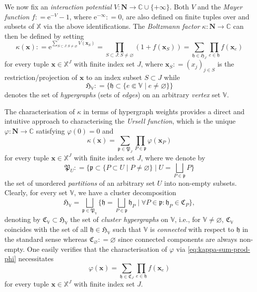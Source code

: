 \documentclass[reqno, 11pt]{amsart}
\theoremstyle{definition}
\newcommand{\e}{\mathrm{e}}
\newcommand{\C}{\mathbb{C}}
\newcommand{\X}{\mathbb X}
\newcommand{\V}{\mathbb V}
\newcommand{\be}{\begin{equation}}
\newcommand{\ee}{\end{equation}}
\begin{document}
We now fix an \emph{interaction potential} $V : \mathbf N \to \C \cup \{+\infty\}$. 
Both $V$ and the \emph{Mayer function} $f : = \e^{-V} - 1$, where $\e^{-\infty} : = 0$, are also defined on finite tuples over and subsets of $\X$ via the above identifications. 
The \emph{Boltzmann factor} $\kappa : \mathbf N \to \C$ can then be defined by setting
\[
	\kappa(\mathbf x) : = \e^{\sum_{S \subset J : S \neq \varnothing} V(\mathbf x_S)} = \prod_{S \subset J : S \neq \varnothing} (1 + f(\mathbf x_S)) = \sum_{\mathfrak h \in \mathfrak H_J} \prod_{e \in \mathfrak h} f(\mathbf x_e)
\]
for every tuple $\mathbf x \in \X^J$ with finite index set $J$, where $\mathbf x_S : = (x_j)_{j \in S}$ is the restriction/projection of $\mathbf x$ to an index subset $S \subset J$ while
\[
	\mathfrak H_\V : = \{\mathfrak h \subset \{e \Subset \V \mid e \neq \varnothing\}\}
\]
denotes the set of \emph{hypergraphs} (sets of \emph{edges}) on an arbitrary \emph{vertex} set $\V$. 

The characterisation of $\kappa$ in terms of hypergraph weights provides a direct and intuitive approach to characterising the \emph{Ursell function}, which is the unique $\varphi : \mathbf N \to \C$ satisfying $\varphi(0) = 0$ and
\be \label{eq:kappa-sum-prod-phi}
	\kappa(\mathbf x) = \sum_{\mathfrak p \in \mathfrak P_J} \prod_{P \in \mathfrak p} \varphi(\mathbf x_P)
\ee
for every tuple $\mathbf x \in \X^J$ with finite index set $J$, where we denote by
\[
	\mathfrak P_U : = \{\mathfrak p \subset \{P \subset U \mid P \neq \varnothing\} \mid U = \textstyle \bigsqcup_{P \in \mathfrak p} P\}
\]
the set of unordered \emph{partitions} of an arbitrary set $U$ into non-empty subsets. 
Clearly, for every set $\V$, we have a cluster decomposition
\[
	\mathfrak H_\V = \bigsqcup_{\mathfrak p \in \mathfrak P_\V} \{\mathfrak h = \textstyle \bigsqcup_{P \in \mathfrak p} \mathfrak h_P \mid \forall P \in \mathfrak p : \mathfrak h_P \in \mathfrak C_P\},
\]
denoting by $\mathfrak C_\V \subset \mathfrak H_\V$ the set of \emph{cluster hypergraphs} on $\V$, i.e., for $\V \neq \varnothing$, $\mathfrak C_\V$ coincides with the set of all $\mathfrak h \in \mathfrak H_\V$ such that $\V$ is \emph{connected} with respect to $\mathfrak h$ in the standard sense whereas $\mathfrak C_\varnothing : = \varnothing$ since connected components are always non-empty. 
One easily verifies that the characterisation of $\varphi$ via \eqref{eq:kappa-sum-prod-phi} necessitates
\[
	\varphi(\mathbf x) = \sum_{\mathfrak h \in \mathfrak C_J} \prod_{e \in \mathfrak h} f(\mathbf x_e)
\]
for every tuple $\mathbf x \in \X^J$ with finite index set $J$.
\end{document}
